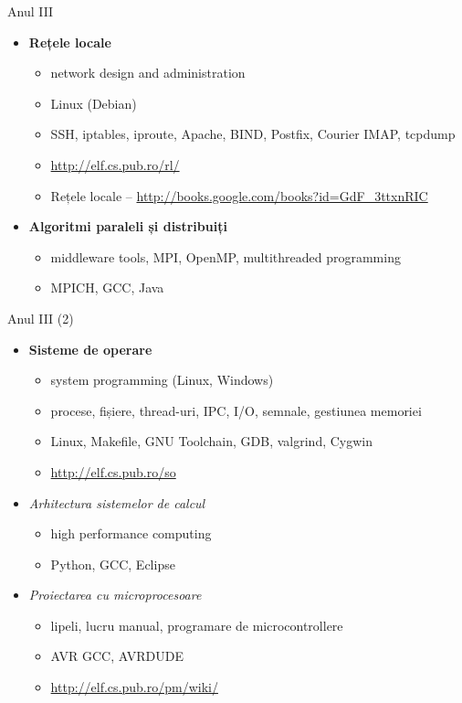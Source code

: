 \documentclass{simple}
\begin{document}
\begin{frame}{Anul III}
	\begin{itemize}
		\item \textbf{Rețele locale}
			\begin{itemize}
				\item network design and administration
				\item Linux (Debian)
				\item SSH, iptables, iproute, Apache, BIND, Postfix, Courier
				IMAP, tcpdump
				\item \url{http://elf.cs.pub.ro/rl/}
				\item Rețele locale --
				\url{http://books.google.com/books?id=GdF_3ttxnRIC}
			\end{itemize}
		\item \textbf{Algoritmi paraleli și distribuiți}
			\begin{itemize}
				\item middleware tools, MPI, OpenMP, multithreaded programming
				\item MPICH, GCC, Java
			\end{itemize}
	\end{itemize}
\end{frame}

\begin{frame}{Anul III (2)}
	\begin{itemize}
		\item \textbf{Sisteme de operare}
			\begin{itemize}
				\item system programming (Linux, Windows)
				\item procese, fișiere, thread-uri, IPC, I/O, semnale,
				gestiunea memoriei
				\item Linux, Makefile, GNU Toolchain, GDB, valgrind, Cygwin
				\item \url{http://elf.cs.pub.ro/so}
			\end{itemize}
		\item \textit{Arhitectura sistemelor de calcul}
			\begin{itemize}
				\item high performance computing
				\item Python, GCC, Eclipse
			\end{itemize}
		\item \textit{Proiectarea cu microprocesoare}
			\begin{itemize}
				\item lipeli, lucru manual, programare de microcontrollere
				\item AVR GCC, AVRDUDE
				\item \url{http://elf.cs.pub.ro/pm/wiki/}
			\end{itemize}
	\end{itemize}
\end{frame}
\end{document}
